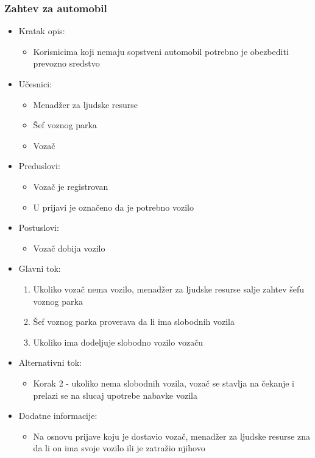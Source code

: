 \subsubsection{\bfseries Zahtev za automobil}
\begin{itemize}
	\item Kratak opis:
		\begin{itemize}
			\item Korisnicima koji nemaju sopstveni automobil potrebno je obezbediti prevozno sredstvo		
		\end{itemize}

	\item Učesnici:
		\begin{itemize}
		    \item Menadžer za ljudske resurse
		    \item Šef voznog parka
		    \item Vozač
		\end{itemize}


	\item Preduslovi:
		\begin{itemize}
		    \item Vozač je registrovan
		    \item U prijavi je označeno da je potrebno vozilo
		\end{itemize}


	\item Postuslovi:
		\begin{itemize}
			\item Vozač dobija vozilo
	\end{itemize}

	\item Glavni tok:
		\begin{enumerate}
		    \item Ukoliko vozač nema vozilo, menadžer za ljudske resurse salje zahtev šefu voznog parka
		    \item Šef voznog parka proverava da li ima slobodnih vozila
		    \item Ukoliko ima dodeljuje slobodno vozilo vozaču
		\end{enumerate}

	\item Alternativni tok:
		\begin{itemize}
		    \item Korak 2 - ukoliko nema slobodnih vozila, vozač se stavlja na čekanje i prelazi se na slucaj upotrebe nabavke vozila
		\end{itemize}

	\item Dodatne informacije:
		\begin{itemize}
			\item Na osnovu prijave koju je dostavio vozač, menadžer za ljudske resurse zna da li on ima svoje vozilo ili je zatražio njihovo
		\end{itemize}

\end{itemize}


